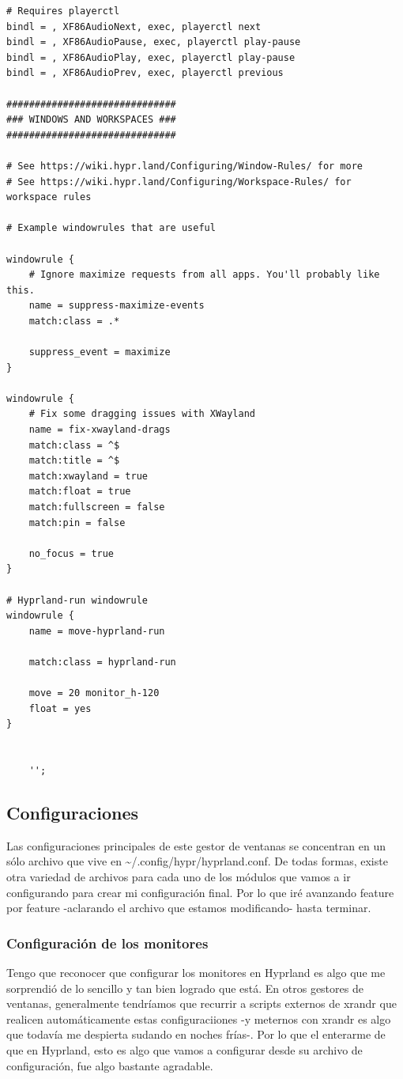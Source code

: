\documentclass[11pt]{article}
\begin{document}
\begin{verbatim}
# Requires playerctl
bindl = , XF86AudioNext, exec, playerctl next
bindl = , XF86AudioPause, exec, playerctl play-pause
bindl = , XF86AudioPlay, exec, playerctl play-pause
bindl = , XF86AudioPrev, exec, playerctl previous

##############################
### WINDOWS AND WORKSPACES ###
##############################

# See https://wiki.hypr.land/Configuring/Window-Rules/ for more
# See https://wiki.hypr.land/Configuring/Workspace-Rules/ for workspace rules

# Example windowrules that are useful

windowrule {
    # Ignore maximize requests from all apps. You'll probably like this.
    name = suppress-maximize-events
    match:class = .*

    suppress_event = maximize
}

windowrule {
    # Fix some dragging issues with XWayland
    name = fix-xwayland-drags
    match:class = ^$
    match:title = ^$
    match:xwayland = true
    match:float = true
    match:fullscreen = false
    match:pin = false

    no_focus = true
}

# Hyprland-run windowrule
windowrule {
    name = move-hyprland-run

    match:class = hyprland-run

    move = 20 monitor_h-120
    float = yes
}


    '';
\end{verbatim}
\subsection{Configuraciones}
\label{sec:orgf9da8e3}

Las configuraciones principales de este gestor de ventanas se concentran en un sólo archivo que vive en \textasciitilde{}/.config/hypr/hyprland.conf. De todas formas, existe otra variedad de archivos para cada uno de los módulos que vamos a ir configurando para crear mi configuración final. Por lo que iré avanzando feature por feature -aclarando el archivo que estamos modificando- hasta terminar.
\subsubsection{Configuración de los monitores}
\label{sec:orgcec353e}

Tengo que reconocer que configurar los monitores en Hyprland es algo que me sorprendió de lo sencillo y tan bien logrado que está. En otros gestores de ventanas, generalmente tendríamos que recurrir a scripts externos de xrandr que realicen automáticamente estas configuraciiones -y meternos con xrandr es algo que todavía me despierta sudando en noches frías-. Por lo que el enterarme de que en Hyprland, esto es algo que vamos a configurar desde su archivo de configuración, fue algo bastante agradable.
\end{document}
